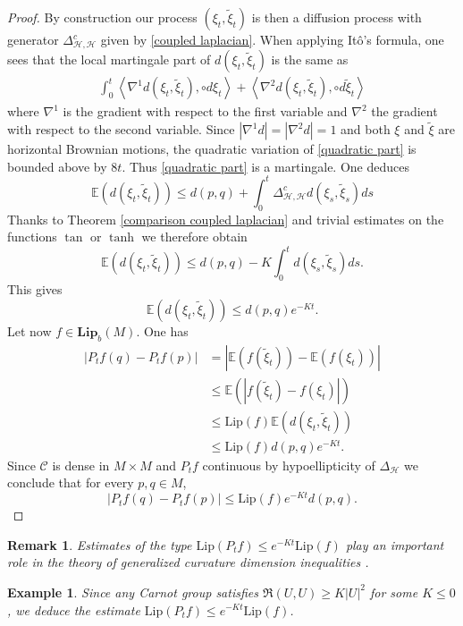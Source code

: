 \documentclass[11pt]{article}
\numberwithin{equation}{section}
\newtheorem{remark}[theorem]{Remark}
\newtheorem{example}[theorem]{Example}
\newcommand{\Ho}{\mathcal H}
\begin{document}
\begin{proof}
 By construction our process $(\xi_t,\tilde{\xi}_t)$ is then a diffusion process with generator $\Delta^c_{\Ho,\Ho}$ given by \eqref{coupled laplacian}.  When applying It\^o's formula, one sees that the local martingale part of $d(\xi_t,\tilde{\xi}_t)$ is the same as 
\begin{align}\label{quadratic part}
\int_0^t \left\langle \nabla^1 d(\xi_t,\tilde{\xi}_t), \circ d\xi_t \right\rangle +\left\langle \nabla^2 d(\xi_t,\tilde{\xi}_t), \circ d\tilde{\xi}_t \right\rangle
\end{align}
where $\nabla^1$ is the gradient with respect to the first variable and $\nabla^2$ the gradient with respect to the second variable. Since $| \nabla^1 d|=| \nabla^2 d|=1$ and both $\xi$ and $\tilde{\xi}$ are horizontal Brownian motions, the quadratic variation of \eqref{quadratic part} is bounded above by $8t$. Thus \eqref{quadratic part} is a martingale. One deduces
\[
\mathbb{E}(d(\xi_t,\tilde{\xi}_t))\le d(p,q)+\int_0^t \Delta^c_{\Ho,\Ho} d (\xi_s,\tilde{\xi}_s)ds
\]
Thanks to Theorem \ref{comparison coupled laplacian} and trivial estimates on the functions $\tan$ or $\tanh$ we therefore obtain
\[
\mathbb{E}(d(\xi_t,\tilde{\xi}_t))\le d(p,q)-K\int_0^t  d (\xi_s,\tilde{\xi}_s)ds.
\]
This gives
\[
\mathbb{E}(d(\xi_t,\tilde{\xi}_t)) \le  d(p,q) e^{-Kt}.
\]
Let now $f \in \mathbf{Lip}_b (M)$. One has
\begin{align*}
|P_tf(q)-P_tf(p)|&= \left| \mathbb{E} \left( f(\tilde{\xi}_t) \right)- \mathbb{E}\left(f(\xi_t)\right) \right| \\
 &\le \mathbb{E} \left( \left| f(\tilde{\xi}_t)- f(\xi_t)\right| \right) \\
 &\le \mathrm{Lip} ( f) \mathbb{E} \left(d(\xi_t,\tilde{\xi}_t) \right) \\
 &\le \mathrm{Lip} ( f) d(p,q) e^{-Kt}.
\end{align*} 
Since $\mathcal C$ is dense in $M \times M$ and $P_tf$ continuous by hypoellipticity of $\Delta_\Ho$ we conclude that for every $p,q \in M$,
\[
|P_tf(q)-P_tf(p)| \le \mathrm{Lip} ( f)  e^{-Kt}d(p,q).
\]
\end{proof}

\begin{remark}
Estimates of the type $\mathrm{Lip} (P_t f)\le e^{-Kt} \mathrm{Lip} ( f)$  play an important role in the theory of generalized curvature dimension inequalities \cite{BBG14,BG170}.
\end{remark}

\begin{example}
Since any Carnot group satisfies $\mathfrak{R}(U,U) \ge K |U|^2$ for some $K \le 0$, we deduce the  estimate $\mathrm{Lip} (P_t f)\le e^{-Kt} \mathrm{Lip} ( f)$.
\end{example}
\end{document}
